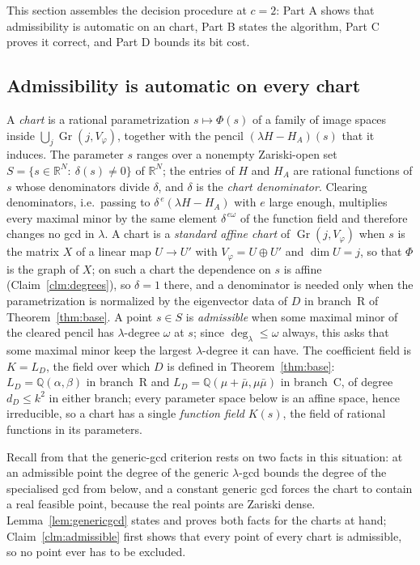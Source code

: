 \documentclass[journal]{IEEEtran}
\theoremstyle{plainn}
\theoremstyle{remark}
\newcommand{\Gr}{\operatorname{Gr}}
\begin{document}
This section assembles the decision procedure at $c=2$: Part A shows that admissibility is automatic on
an chart, Part B states the algorithm, Part C proves it correct, and Part D bounds its bit
cost.

\subsection{Admissibility is automatic on every chart}\label{sec:admissible}

A \emph{chart} is a rational parametrization $s\mapsto\Phi(s)$ of a family of image spaces inside
$\bigcup_j\Gr(j,V_\varphi)$, together with the pencil $(\lambda H-H_A)(s)$ that it induces. The parameter
$s$ ranges over a nonempty Zariski-open set $S=\{s\in\mathbb R^N:\ \delta(s)\neq0\}$ of $\mathbb R^N$; the
entries of $H$ and $H_A$ are rational functions of $s$ whose denominators divide $\delta$, and $\delta$ is
the \emph{chart denominator}. Clearing denominators, i.e.\ passing to $\delta^{\,e}(\lambda H-H_A)$ with $e$
large enough, multiplies every maximal minor by the same element $\delta^{\,e\omega}$ of the function field
and therefore changes no gcd in $\lambda$. A chart is a \emph{standard affine chart} of $\Gr(j,V_\varphi)$
when $s$ is the matrix $X$ of a linear map $U\to U'$ with $V_\varphi=U\oplus U'$ and $\dim U=j$, so that
$\Phi$ is the graph of $X$; on such a chart the dependence on $s$ is affine
(Claim~\ref{clm:degrees}), so $\delta=1$ there, and a denominator is needed only when the parametrization is
normalized by the eigenvector data of $D$ in branch~R of Theorem~\ref{thm:base}. A point $s\in S$ is
\emph{admissible} when some maximal minor of the cleared pencil has $\lambda$-degree $\omega$ at $s$; since
$\deg_\lambda\le\omega$ always, this asks that some maximal minor keep the largest $\lambda$-degree it can
have. The coefficient field is $K=L_D$, the field over which $D$ is defined in
Theorem~\ref{thm:base}: $L_D=\mathbb Q(\alpha,\beta)$ in branch~R and
$L_D=\mathbb Q(\mu+\bar\mu,\mu\bar\mu)$ in branch~C, of degree $d_D\le k^2$ in either branch; every
parameter space below is an affine space, hence irreducible, so a chart has a
single \emph{function field} $K(s)$, the field of rational functions in its parameters.

Recall from \cite{companion3} that the generic-gcd criterion rests on two facts in this situation: at an
admissible point the degree of the generic $\lambda$-gcd bounds the degree of the specialised gcd from
below, and a constant generic gcd forces the chart to contain a real feasible point, because the real points
are Zariski dense. Lemma~\ref{lem:genericgcd} states and proves both facts for the charts at hand;
Claim~\ref{clm:admissible} first shows that every point of every chart is admissible, so no point ever has
to be excluded.
\end{document}
